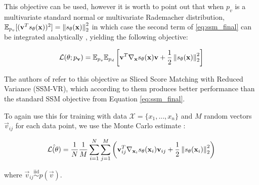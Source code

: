 This objective can be used, however
it is worth to point out that when $p_v$ is a multivariate standard normal or multivariate Rademacher distribution, 
$\mathbb{E}_{p_v} [ ( \textbf{v}^T s_\theta(\textbf{x}) )^2 ] = \left\lVert s_\theta(\textbf{x})\right\rVert_2^2$ in which case the second term 
of \ref{eq:ssm_final} can be integrated analytically \cite{ssm}, yielding the following objective:

\begin{equation}
    \mathcal{L}(\theta; p_{\textbf{v}}) = \mathbb{E}_{p_v} \mathbb{E}_{p_d} \left[ \textbf{v}^T \nabla_{\textbf{x}} s_\theta(\textbf{x}) \textbf{v} + \frac{1}{2} \left\lVert s_\theta(\textbf{x}) \right\rVert^2_2 \right]
\end{equation}

The authors of \cite{ssm} refer to this objective as 
Sliced Score Matching with Reduced Variance (SSM-VR), which according to them produces better performance than the standard SSM objective from Equation \ref{eq:ssm_final}.

To again use this for training with data $\mathcal{X} = \{x_1, ..., x_n\}$ and $M$ random vectors $\vec v_{ij}$ for each data point, we use the Monte Carlo estimate \cite{ssm}:

\begin{equation}
    \label{eq:ssm_vr}
    \hat{\mathcal{L}(\theta)} = \frac{1}{N} \frac{1}{M} \sum_{i=1}^{N} \sum_{j=1}^{M} \left( \textbf{v}_{ij}^T \nabla_{\textbf{x}_i} s_{\theta}(\textbf{x}_i) \textbf{v}_{ij} + \frac{1}{2} \left\lVert s_{\theta}(\textbf{x}_i) \right\rVert^2_2 \right)
\end{equation}

where $\vec v_{ij} \overset{\text{iid}}{\sim} p(\vec v)$.